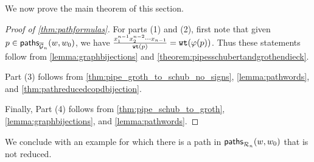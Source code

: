 \documentclass[12 pt]{amsart}
\newcommand{\paths}{{\sf paths}}
\numberwithin{equation}{section}
\theoremstyle{remark}
\newcommand{\wt}{{\tt wt}}
\begin{document}
		We now prove the main theorem of this section.
		\begin{proof}[Proof of \cref{thm:pathformulas}]
For parts (1) and (2), first note that given $p\in \paths_{\overline{\mathcal{G}}_n}(w,w_0)$, we have $\frac{x_1^{n-1}x_2^{n-2}\cdots x_{n-1}}{\wt(p)}=\wt(\varphi(p))$. Thus these statements follow from \cref{lemma:graphbijections} and \cref{theorem:pipesschubertandgrothendieck}.

Part (3) follows from \cref{thm:pipe_groth_to_schub_no_signs}, \cref{lemma:pathwords}, and \cref{thm:pathreducedcopdbijection}.

Finally, Part (4) follows from \cref{thm:pipe_schub_to_groth}, \cref{lemma:graphbijections}, and \cref{lemma:pathwords}.
		\end{proof}
	
	
	We conclude with an example for which there is a path in $\paths_{\mathcal{R}_n}(w,w_0)$ that is not reduced.
	
\end{document}
